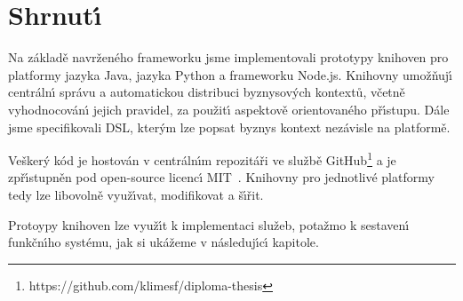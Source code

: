 
\section{Shrnut\'{\i}}

Na základě navrženého frameworku jsme implementovali prototypy
knihoven pro platformy jazyka Java, jazyka Python a frameworku
Node.js. Knihovny umožňuj\'{\i} centráln\'{\i} správu a automatickou distribuci
byznysov\'ych kontextů, včetně vyhodnocován\'{\i} jejich pravidel, za
použit\'{\i} aspektově orientovaného př\'{\i}stupu.
Dále jsme specifikovali \gls{DSL}, kter\'ym lze popsat byznys kontext
nezávisle na platformě.

Vešker\'y kód je hostován v centráln\'{\i}m repozitáři
ve službě GitHub\footnote{
https://github.com/klimesf/diploma-thesis
} a je zpř\'{\i}stupněn pod open-source licenc\'{\i} MIT~\cite{mitlicense}.
Knihovny pro jednotlivé platformy tedy lze libovolně
využ\'{\i}vat, modifikovat a š\'{\i}řit.

Protoypy knihoven lze využ\'{\i}t k implementaci služeb,
potažmo k sestaven\'{\i} funkčn\'{\i}ho systému, jak si ukážeme
v následuj\'{\i}c\'{\i} kapitole.
